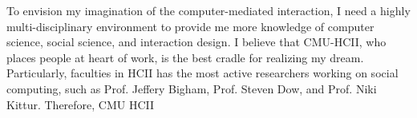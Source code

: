 \noindent
To envision my imagination of the computer-mediated interaction, 
I need a highly multi-disciplinary environment to provide me more knowledge of computer science, social science, and interaction design. 
I believe that CMU-HCII, who places people at heart of work, is the best cradle for realizing my dream.
Particularly, faculties in HCII has the most active researchers working on social computing,
such as Prof. Jeffery Bigham, Prof. Steven Dow, and Prof. Niki Kittur. 
Therefore, CMU HCII \\ 



